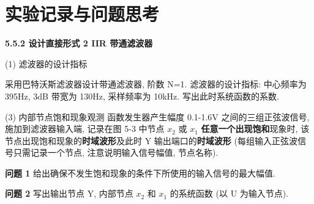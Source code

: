 \documentclass{dspreport}
\begin{document}
\maketitle

\section{实验记录与问题思考}
\noindent\textbf{5.5.2 设计直接形式 2 IIR 带通滤波器}

\noindent(1) 滤波器的设计指标

采用巴特沃斯滤波器设计带通滤波器, 阶数 N=1. 滤波器的设计指标: 中心频率为 395Hz, 3dB 带宽为 130Hz, 采样频率为 10kHz. 写出此时系统函数的系数.

\begin{block}

\end{block}

\noindent(3) 内部节点饱和现象观测
函数发生器产生幅度 0.1-1.6V 之间的三组正弦波信号, 施加到滤波器输入端, 记录在图 5-3 中节点 $x_2$ 或 $x_1$ \textbf{任意一个出现饱和}现象时, 该节点出现饱和现象的\textbf{时域波形}及此时 Y 输出端口的\textbf{时域波形} (每组输入正弦波信号只需记录一个节点, 注意说明输入信号幅值, 节点名称).

\begin{block}

\end{block}

\begin{figure}[H]

\end{figure}

\begin{block}

\end{block}

\noindent\textbf{问题 1} 给出确保不发生饱和现象的条件下所使用的输入信号的最大幅值.

\begin{block}

\end{block}

\noindent\textbf{问题 2} 写出输出节点 Y, 内部节点 $x_2$ 和 $x_1$ 的系统函数 (以 U 为输入节点).

\begin{block}

\end{block}
\end{document}
